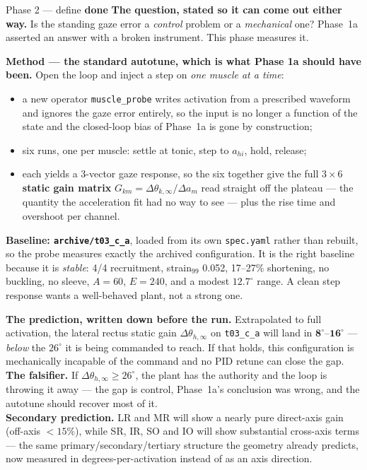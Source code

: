 \documentclass[11pt,a4paper]{article}
\newcommand{\code}[1]{\texttt{#1}}
\newcommand{\dn}{\textcolor{good}{\textbf{done}}}
\begin{document}
\begin{phasebox}{Phase 2 --- define \hfill \dn}
\textbf{The question, stated so it can come out either way.} Is the standing gaze error a
\emph{control} problem or a \emph{mechanical} one? Phase~1a asserted an answer with a broken
instrument. This phase measures it.

\textbf{Method --- the standard autotune, which is what Phase 1a should have been.} Open the loop
and inject a step on \emph{one muscle at a time}:

\begin{itemize}
\item a new operator \code{muscle\_probe} writes activation from a prescribed waveform and ignores
the gaze error entirely, so the input is no longer a function of the state and the
closed-loop bias of Phase~1a is gone by construction;
\item six runs, one per muscle: settle at tonic, step to $a_{hi}$, hold, release;
\item each yields a 3-vector gaze response, so the six together give the full $3\times6$
\textbf{static gain matrix} $G_{km} = \Delta\theta_{k,\infty}/\Delta a_m$ read straight off the
plateau --- the quantity the acceleration fit had no way to see --- plus the rise time and
overshoot per channel.
\end{itemize}

\textbf{Baseline: \code{archive/t03\_c\_a}}, loaded from its own \code{spec.yaml} rather than
rebuilt, so the probe measures exactly the archived configuration. It is the right baseline because
it is \emph{stable}: 4/4 recruitment, strain$_{99}$ 0.052, 17--27\% shortening, no buckling, no
sleeve, $A=60$, $E=240$, and a modest $12.7^\circ$ range. A clean step response wants a
well-behaved plant, not a strong one.

\begin{tcolorbox}[colback=rule!5,colframe=rule!45,boxrule=0.7pt,arc=2pt]
\textbf{The prediction, written down before the run.} Extrapolated to full activation, the lateral
rectus static gain $\Delta\theta_{h,\infty}$ on \code{t03\_c\_a} will land in
$\mathbf{8^\circ}$--$\mathbf{16^\circ}$ --- \emph{below} the $26^\circ$ it is being commanded to
reach. If that holds, this configuration is mechanically incapable of the command and no PID retune
can close the gap. \\[3pt]
\textbf{The falsifier.} If $\Delta\theta_{h,\infty} \ge 26^\circ$, the plant has the authority and
the loop is throwing it away --- the gap is control, Phase~1a's conclusion was wrong, and the
autotune should recover most of it. \\[3pt]
\textbf{Secondary prediction.} LR and MR will show a nearly pure direct-axis gain (off-axis
$<15\%$), while SR, IR, SO and IO will show substantial cross-axis terms --- the same
primary/secondary/tertiary structure the geometry already predicts, now measured in
degrees-per-activation instead of as an axis direction.
\end{tcolorbox}


\end{phasebox}
\end{document}
